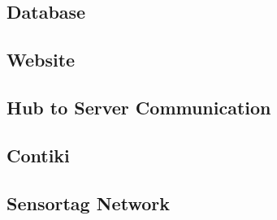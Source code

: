 \documentclass[PPFS.tex]{template/subfiles}
\begin{document}
\subsection{Database}

\subsection{Website}

\subsection{Hub to Server Communication}

\subsection{Contiki}

\subsection{Sensortag Network}
\end{document}
